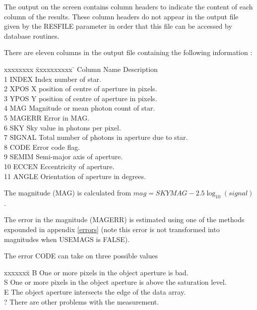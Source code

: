\documentclass[twoside,11pt,nolof]{starlink}
\begin{document}
{{   The output on the screen contains column headers to indicate the content of
   each column of the results. These column headers do not appear in the
   output file given by the RESFILE parameter in order that this file can be
   accessed by database routines.

   There are eleven columns in the output file containing the following
   information :

   \begin{tabbing}
   xxxxxxxx \= xxxxxxxxxx \= \kill
   Column \> Name  \> Description \\
    1 \> INDEX \> Index number of star.\\
    2 \> XPOS \> X position of centre of aperture in pixels.\\
    3 \> YPOS \> Y position of centre of aperture in pixels.\\
    4 \> MAG \> Magnitude or mean photon count of star.\\
    5 \> MAGERR \> Error in MAG.\\
    6 \> SKY \> Sky value in photons per pixel.\\
    7 \> SIGNAL \> Total number of photons in aperture due to star.\\
    8 \> CODE \> Error code flag.\\
    9 \> SEMIM \> Semi-major axis of aperture.\\
    10 \> ECCEN \> Eccentricity of aperture.\\
    11 \> ANGLE \> Orientation of aperture in degrees.\\
   \end{tabbing}

   The magnitude (MAG) is calculated from
      $mag = SKYMAG - 2.5 \log_{10} ( signal )$.

   The error in the magnitude (MAGERR) is estimated using one of the
   methods expounded in appendix \ref{errors} (note this error is not
   transformed into magnitudes when USEMAGS is FALSE).

   The error CODE can take on three possible values
   \begin{tabbing}
   xxxxxxx\=\kill
   B \> One or more pixels in the object aperture is bad.\\
   S \> One or more pixels in the object aperture is above the saturation level.\\
   E \> The object aperture intersects the edge of the data array.\\
   ? \> There are other problems with the measurement.
   \end{tabbing}

}}
\end{document}
